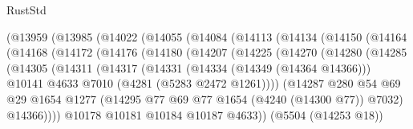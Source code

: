 \begin{lexlean}{RustStd}
\begin{coremodule}
              (@13959
                (@13985
                  (@14022
                    (@14055
                      (@14084
                        (@14113
                          (@14134
                            (@14150
                              (@14164
                                (@14168
                                  (@14172
                                    (@14176
                                      (@14180
                                        (@14207
                                          (@14225
                                            (@14270
                                              (@14280
                                                (@14285
                                                  (@14305
                                                    (@14311
                                                      (@14317
                                                        (@14331
                                                          (@14334 (@14349 (@14364 @14366)))
                                                          @10141
                                                          @4633
                                                          @7010
                                                          (@4281 (@5283 @2472 @1261))))
                                                      (@14287
                                                        @280
                                                        @54
                                                        @69
                                                        @29
                                                        @1654
                                                        @1277
                                                        (@14295
                                                          @77
                                                          @69
                                                          @77
                                                          @1654
                                                          (@4240 (@14300 @77))
                                                          @7032)
                                                        @14366))))
                                                @10178
                                                @10181
                                                @10184
                                                @10187
                                                @4633))
                                            (@5504 (@14253 @18))

\end{coremodule}
\end{lexlean}
